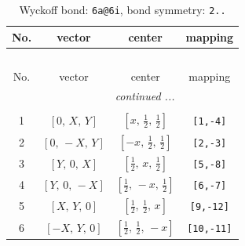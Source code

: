 \documentclass[fleqn,8pt]{jsarticle}
\begin{document}
\renewcommand{\arraystretch}{1.2}
\begin{longtable}{cccc}
\caption{Wyckoff bond: {\tt 6a@6i}, bond symmetry: {\tt 2..}}
 \\
 \hline \hline
No. & vector & center & mapping \\ \hline \endfirsthead

\multicolumn{3}{l}{\tablename\ \thetable{}} \\
 \hline \hline
No. & vector & center & mapping \\ \hline \endhead

 \hline \hline
\multicolumn{3}{r}{\footnotesize\it continued ...} \\ \endfoot

 \hline \hline
\multicolumn{3}{r}{} \\ \endlastfoot

1 & $\left[ 0,\, X,\, Y \right]$ & $\left[ x,\, \frac{1}{2},\, \frac{1}{2} \right]$ & {\tt [1,-4]} \\ \hline
2 & $\left[ 0,\, - X,\, Y \right]$ & $\left[ - x,\, \frac{1}{2},\, \frac{1}{2} \right]$ & {\tt [2,-3]} \\ \hline
3 & $\left[ Y,\, 0,\, X \right]$ & $\left[ \frac{1}{2},\, x,\, \frac{1}{2} \right]$ & {\tt [5,-8]} \\ \hline
4 & $\left[ Y,\, 0,\, - X \right]$ & $\left[ \frac{1}{2},\, - x,\, \frac{1}{2} \right]$ & {\tt [6,-7]} \\ \hline
5 & $\left[ X,\, Y,\, 0 \right]$ & $\left[ \frac{1}{2},\, \frac{1}{2},\, x \right]$ & {\tt [9,-12]} \\ \hline
6 & $\left[ - X,\, Y,\, 0 \right]$ & $\left[ \frac{1}{2},\, \frac{1}{2},\, - x \right]$ & {\tt [10,-11]} \\
\end{longtable}
\renewcommand{\arraystretch}{1.2}
\end{document}
